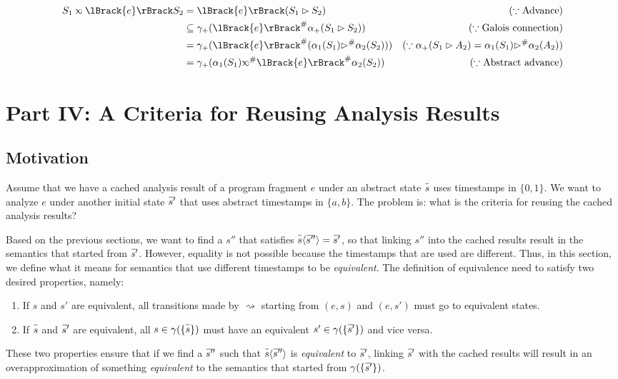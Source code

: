 \documentclass{article}
\theoremstyle{definition}
\def\ovbarw{1.2mu}
\def\ovbarh{1}
\newcommand*{\ovbar}[1]{\mkern \ovbarw\overline{\mkern-\ovbarw{\smash{#1}\scalebox{1}[\ovbarh]{\vphantom{i}}}\mkern-\ovbarw}\mkern \ovbarw}
\newcommand*{\A}[1]{\ovbar{#1}}
\newcommand*{\Abs}[1]{{#1}^{\#}}
\newcommand*{\semarrow}{\rightsquigarrow}
\newcommand*{\semlink}{\mathbin{\rotatebox[origin=c]{180}{$\propto$}}}
\newcommand*{\sembracket}[1]{\lBrack{#1}\rBrack}
\newcommand*{\inject}[2]{{#2}\langle{#1}\rangle}
\begin{document}
\begin{align*}
  S_1\semlink\sembracket{e}S_2 & =\sembracket{e}(S_1\rhd S_2)                                          & (\because\text{Advance})                                           \\
                               & \subseteq\gamma_+(\Abs{\sembracket{e}}\alpha_+(S_1\rhd S_2))          & (\because\text{Galois connection})                                 \\
                               & =\gamma_+(\Abs{\sembracket{e}}(\alpha_1(S_1)\Abs\rhd\alpha_2(S_2)))   & (\because\alpha_+(S_1\rhd A_2)=\alpha_1(S_1)\Abs\rhd\alpha_2(A_2)) \\
                               & =\gamma_+(\alpha_1(S_1)\Abs\semlink\Abs{\sembracket{e}}\alpha_2(S_2)) & (\because\text{Abstract advance})
\end{align*}
\section{Part IV: A Criteria for Reusing Analysis Results}
\subsection{Motivation}
Assume that we have a cached analysis result of a program fragment $e$ under an abstract state $\A{s}$ uses timestamps in $\{0,1\}$.
We want to analyze $e$ under another initial state $\A{s'}$ that uses abstract timestamps in $\{a,b\}$.
The problem is: what is the criteria for reusing the cached analysis results?

Based on the previous sections, we want to find a $s''$ that satisfies $\inject{\A{s''}}{\A{s}}=\A{s'}$, so that linking $s''$ into the cached results result in the semantics that started from $\A{s'}$.
However, equality is not possible because the timestamps that are used are different.
Thus, in this section, we define what it means for semantics that use different timestamps to be \emph{equivalent}.
The definition of equivalence need to satisfy two desired properties, namely:
\begin{enumerate}
  \item If $s$ and $s'$ are equivalent, all transitions made by $\semarrow$ starting from $(e,s)$ and $(e,s')$ must go to equivalent states.
  \item If $\A{s}$ and $\A{s'}$ are equivalent, all $s\in\gamma(\{\A{s}\})$ must have an equivalent $s'\in\gamma(\{\A{s'}\})$ and vice versa.
\end{enumerate}
These two properties ensure that if we find a $\A{s''}$ such that $\inject{\A{s''}}{\A{s}}$ is \emph{equivalent} to $\A{s'}$, linking $\A{s'}$ with the cached results will result in an overapproximation of something \emph{equivalent} to the semantics that started from $\gamma(\{\A{s'}\})$.
\end{document}
